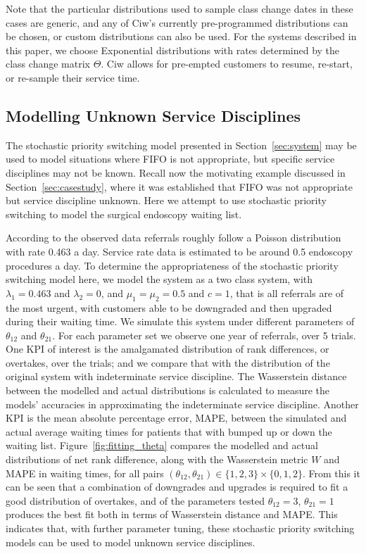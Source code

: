 \documentclass{article}
\begin{document}
Note that the particular distributions used to sample class change dates in
these cases are generic, and any of Ciw's currently pre-programmed distributions
can be chosen, or custom distributions can also be used. For the systems
described in this paper, we choose Exponential distributions with rates
determined by the class change matrix $\Theta$. Ciw allows for 
pre-empted customers to resume, re-start, or re-sample their service time.

\subsection{Modelling Unknown Service Disciplines}\label{sec:modelling}
The stochastic priority switching model presented in Section~\ref{sec:system}
may be used to model situations where FIFO is not appropriate, but specific
service disciplines may not be known. Recall now the motivating example
discussed in Section~\ref{sec:casestudy}, where it was established that FIFO was
not appropriate but service discipline unknown. Here we attempt to use
stochastic priority switching to model the surgical endoscopy waiting list.

According to the observed data referrals roughly follow a Poisson distribution
with rate 0.463 a day. Service rate data is estimated to be around 0.5
endoscopy procedures a day. To determine the appropriateness of the stochastic
priority switching model here, we model the system as a two class system, with
$\lambda_1 = 0.463$ and $\lambda_2 = 0$, and $\mu_1 = \mu_2 = 0.5$ and $c = 1$,
that is all referrals are of the most urgent, with customers able to be
downgraded and then upgraded during their waiting time. We simulate this
system under different parameters of $\theta_{12}$ and $\theta_{21}$. For each
parameter set we observe one year of referrals, over 5 trials. One KPI of
interest is the amalgamated distribution of rank differences, or overtakes,
over the trials; and we compare that with the
distribution of the original system with indeterminate service discipline. The
Wasserstein distance \cite{mostafaei11} between the modelled and actual
distributions is calculated to measure the models' accuracies in approximating
the indeterminate service discipline.
Another KPI is the mean absolute percentage error, MAPE, between the simulated
and actual average waiting times for patients that with bumped up or down the
waiting list.
Figure~\ref{fig:fitting_theta} compares the modelled and actual distributions of
net rank difference, along with the Wasserstein metric $W$ and MAPE in waiting
times, for all pairs
$\left(\theta_{12}, \theta_{21}\right) \in \{1, 2, 3\}\times\{0, 1, 2\}$. From
this it can be seen that a combination of downgrades and upgrades is required to
fit a good distribution of overtakes, and of the parameters tested
$\theta_{12}=3$, $\theta_{21}=1$ produces the best fit both in terms of
Wasserstein distance and MAPE. This indicates that, with further parameter
tuning, these stochastic priority switching models can be used to model unknown
service disciplines.
\end{document}
